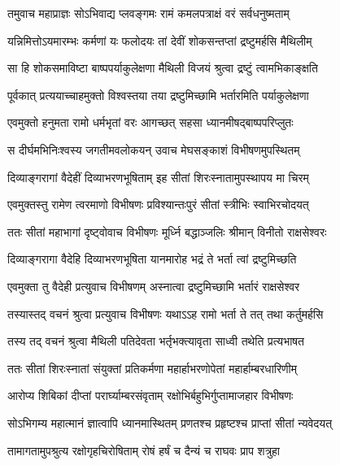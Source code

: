 
\twolineshloka
{तमुवाच महाप्राज्ञः सोऽभिवाद्य प्लवङ्गमः}
{रामं कमलपत्राक्षं वरं सर्वधनुष्मताम्} %

\twolineshloka
{यन्निमित्तोऽयमारम्भः कर्मणां यः फलोदयः}
{तां देवीं शोकसन्तप्तां द्रष्टुमर्हसि मैथिलीम्} %

\twolineshloka
{सा हि शोकसमाविष्टा बाष्पपर्याकुलेक्षणा}
{मैथिली विजयं श्रुत्वा द्रष्टुं त्वामभिकाङ्क्षति} %

\twolineshloka
{पूर्वकात् प्रत्ययाच्चाहमुक्तो विश्वस्तया तया}
{द्रष्टुमिच्छामि भर्तारमिति पर्याकुलेक्षणा} %

\twolineshloka
{एवमुक्तो हनुमता रामो धर्मभृतां वरः}
{आगच्छत् सहसा ध्यानमीषद्बाष्पपरिप्लुतः} %

\twolineshloka
{स दीर्घमभिनिःश्वस्य जगतीमवलोकयन्}
{उवाच मेघसङ्काशं विभीषणमुपस्थितम्} %

\twolineshloka
{दिव्याङ्गरागां वैदेहीं दिव्याभरणभूषिताम्}
{इह सीतां शिरःस्नातामुपस्थापय मा चिरम्} %

\twolineshloka
{एवमुक्तस्तु रामेण त्वरमाणो विभीषणः}
{प्रविश्यान्तःपुरं सीतां स्त्रीभिः स्वाभिरचोदयत्} %

\twolineshloka
{ततः सीतां महाभागां दृष्ट्वोवाच विभीषणः}
{मूर्ध्नि बद्धाञ्जलिः श्रीमान् विनीतो राक्षसेश्वरः} %

\twolineshloka
{दिव्याङ्गरागा वैदेहि दिव्याभरणभूषिता}
{यानमारोह भद्रं ते भर्ता त्वां द्रष्टुमिच्छति} %

\twolineshloka
{एवमुक्ता तु वैदेही प्रत्युवाच विभीषणम्}
{अस्नात्वा द्रष्टुमिच्छामि भर्तारं राक्षसेश्वर} %

\twolineshloka
{तस्यास्तद् वचनं श्रुत्वा प्रत्युवाच विभीषणः}
{यथाऽऽह रामो भर्ता ते तत् तथा कर्तुमर्हसि} %

\twolineshloka
{तस्य तद् वचनं श्रुत्वा मैथिली पतिदेवता}
{भर्तृभक्त्यावृता साध्वी तथेति प्रत्यभाषत} %

\twolineshloka
{ततः सीतां शिरःस्नातां संयुक्तां प्रतिकर्मणा}
{महार्हाभरणोपेतां महार्हाम्बरधारिणीम्} %

\twolineshloka
{आरोप्य शिबिकां दीप्तां परार्घ्याम्बरसंवृताम्}
{रक्षोभिर्बहुभिर्गुप्तामाजहार विभीषणः} %

\twolineshloka
{सोऽभिगम्य महात्मानं ज्ञात्वापि ध्यानमास्थितम्}
{प्रणतश्च प्रहृष्टश्च प्राप्तां सीतां न्यवेदयत्} %

\twolineshloka
{तामागतामुपश्रुत्य रक्षोगृहचिरोषिताम्}
{रोषं हर्षं च दैन्यं च राघवः प्राप शत्रुहा} %

